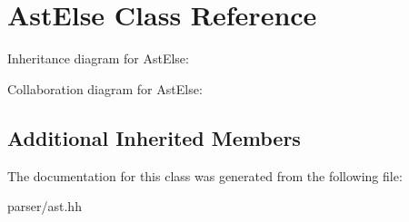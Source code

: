 \hypertarget{classAstElse}{}\section{Ast\+Else Class Reference}
\label{classAstElse}


Inheritance diagram for Ast\+Else\+:


Collaboration diagram for Ast\+Else\+:
\subsection*{Additional Inherited Members}


The documentation for this class was generated from the following file\+:\begin{DoxyCompactItemize}
\item 
parser/ast.\+hh\end{DoxyCompactItemize}
